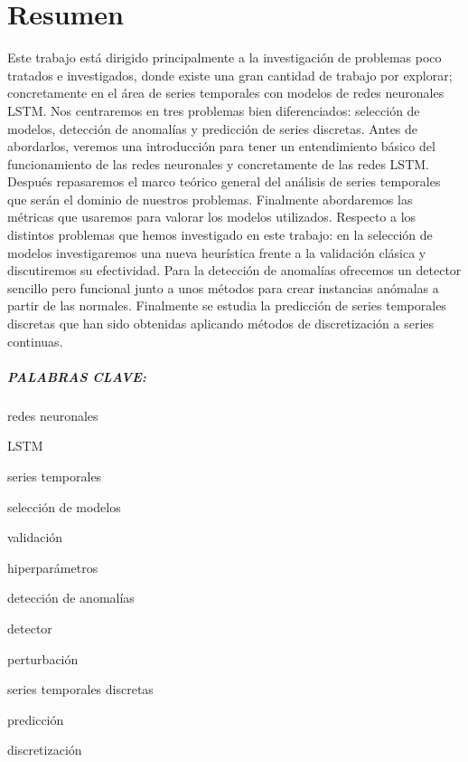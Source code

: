 %


\chapter*{Resumen}\label{ch:resumen}

Este trabajo está dirigido principalmente a la investigación de problemas poco tratados e investigados, donde existe una gran cantidad de trabajo por explorar; concretamente en el área de series temporales con modelos de redes neuronales LSTM. Nos centraremos en tres problemas bien diferenciados: selección de modelos, detección de anomalías y predicción de series discretas. Antes de abordarlos, veremos una introducción para tener un entendimiento básico del funcionamiento de las redes neuronales y concretamente de las redes LSTM. Después repasaremos el marco teórico general del análisis de series temporales que serán el dominio de nuestros problemas. Finalmente abordaremos las métricas que usaremos para valorar los modelos utilizados. Respecto a los distintos problemas que hemos investigado en este trabajo: en la selección de modelos investigaremos una nueva heurística frente a la validación clásica y discutiremos su efectividad. Para la detección de anomalías ofrecemos un detector sencillo pero funcional junto a unos métodos para crear instancias anómalas a partir de las normales. Finalmente se estudia la predicción de series temporales discretas que han sido obtenidas aplicando métodos de discretización a series continuas.

\paragraph{PALABRAS CLAVE:}
\begin{itemize*}[label=,itemsep=1em,itemjoin=\hspace{1em}]
  \item redes neuronales
  \item LSTM
  \item series temporales
  \item selección de modelos
  \item validación
  \item hiperparámetros
  \item detección de anomalías
  \item detector
  \item perturbación
  \item series temporales discretas
  \item predicción
  \item discretización
\end{itemize*}

\endinput
